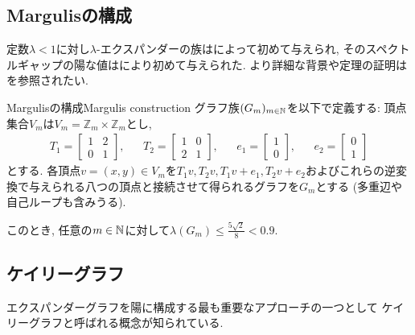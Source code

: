 \subsection{Margulisの構成}
定数$\lambda<1$に対し$\lambda$-エクスパンダーの族は\citet{Margulis1973}によって初めて与えられ,
そのスペクトルギャップの陽な値は\citet{GG81}により初めて与えられた.
より詳細な背景や定理の証明は\cite{HLW06}を参照されたい.
\begin{theorem}{Margulisの構成}{Margulis construction}
    グラフ族$(G_m)_{m\in\mathbb{N}}$を以下で定義する:
    頂点集合$V_m$は$V_m=\mathbb{Z}_m \times \mathbb{Z}_m$とし,
    \begin{align*}
        T_1 = \begin{bmatrix}
            1 & 2 \\
            0 & 1
        \end{bmatrix},& &
        T_2 = \begin{bmatrix}
            1 & 0 \\
            2 & 1
        \end{bmatrix},& &
        e_1 = \begin{bmatrix}
            1 \\
            0
        \end{bmatrix}, & &
        e_2 = \begin{bmatrix}
            0 \\
            1
        \end{bmatrix}
    \end{align*}
    とする.
    各頂点$v=(x,y)\in V_m$を$T_1v,T_2v,T_1v+e_1,T_2v+e_2$およびこれらの逆変換で与えられる八つの頂点と接続させて得られるグラフを$G_m$とする (多重辺や自己ループも含みうる).

    このとき, 任意の$m\in\mathbb{N}$に対して$\lambda(G_m) \le \frac{5\sqrt{2}}{8} < 0.9$.
\end{theorem}

\subsection{ケイリーグラフ}
エクスパンダーグラフを陽に構成する最も重要なアプローチの一つとして
ケイリーグラフ\cite{Cayley1878}と呼ばれる概念が知られている.


